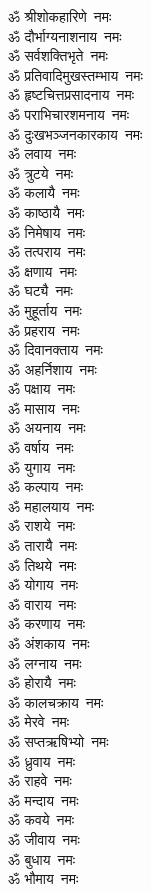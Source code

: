 \begin{multicols}{2}
\begin{flushleft}
ॐ श्रीशोकहारिणे~नमः\\
ॐ दौर्भाग्यनाशनाय~नमः\\
ॐ सर्वशक्तिभृते~नमः\\
ॐ प्रतिवादिमुखस्तम्भाय~नमः\\
ॐ हृष्टचित्तप्रसादनाय~नमः\\
ॐ पराभिचारशमनाय~नमः\\
ॐ दुःखभञ्जनकारकाय~नमः\\
ॐ लवाय~नमः\hfill{}\\
ॐ त्रुटये~नमः\\
ॐ कलायै~नमः\\
ॐ काष्ठायै~नमः\\
ॐ निमेषाय~नमः\\
ॐ तत्पराय~नमः\\
ॐ क्षणाय~नमः\\
ॐ घट्यै~नमः\\
ॐ मुहूर्ताय~नमः\\
ॐ प्रहराय~नमः\\
ॐ दिवानक्ताय~नमः\hfill{}\\
ॐ अहर्निशाय~नमः\\
ॐ पक्षाय~नमः\\
ॐ मासाय~नमः\\
ॐ अयनाय~नमः\\
ॐ वर्षाय~नमः\\
ॐ युगाय~नमः\\
ॐ कल्पाय~नमः\\
ॐ महालयाय~नमः\\
ॐ राशये~नमः\\
ॐ तारायै~नमः\hfill{}\\
ॐ तिथये~नमः\\
ॐ योगाय~नमः\\
ॐ वाराय~नमः\\
ॐ करणाय~नमः\\
ॐ अंशकाय~नमः\\
ॐ लग्नाय~नमः\\
ॐ होरायै~नमः\\
ॐ कालचक्राय~नमः\\
ॐ मेरवे~नमः\\
ॐ सप्तऋषिभ्यो~नमः\hfill{}\\
ॐ ध्रुवाय~नमः\\
ॐ राहवे~नमः\\
ॐ मन्दाय~नमः\\
ॐ कवये~नमः\\
ॐ जीवाय~नमः\\
ॐ बुधाय~नमः\\
ॐ भौमाय~नमः\\

\end{flushleft}
\end{multicols}
